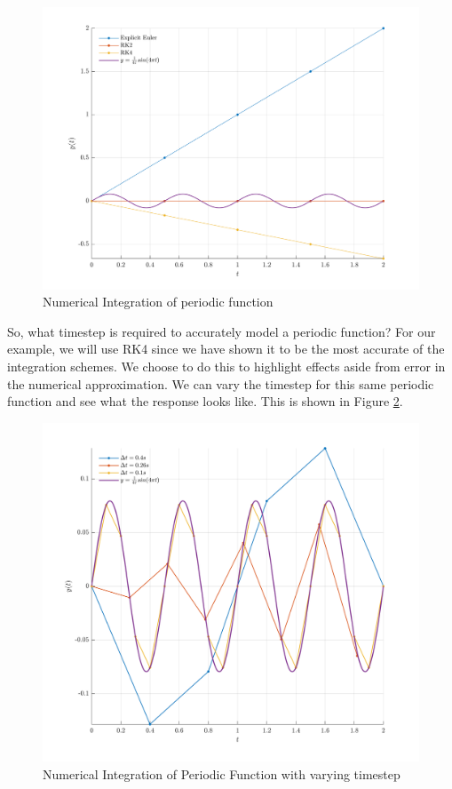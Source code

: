 \documentclass[12pt]{report}
\begin{document}
\begin{figure} [ht]
    \centering
    \includegraphics[width=\linewidth]{6DoF Explanation Scripts/Numerical Integrator Nyquist 1.png}
    \caption{Numerical Integration of periodic function}
    \label{fig:Numerical Int Periodic}
\end{figure}
So, what timestep is required to accurately model a periodic function? For our example, we will use RK4 since we have shown it to be the most accurate of the integration schemes. We choose to do this to highlight effects aside from error in the numerical approximation. We can vary the timestep for this same periodic function and see what the response looks like. This is shown in Figure \ref{fig:Nyquist}.
\begin{figure}[ht]
    \centering
    \includegraphics[width=0.9\linewidth]{6DoF Explanation Scripts/Numerical Integrator Nyquist 2.png}
    
    \caption{Numerical Integration of Periodic Function with varying timestep}
    \label{fig:Nyquist}
\end{figure}
\end{document}
